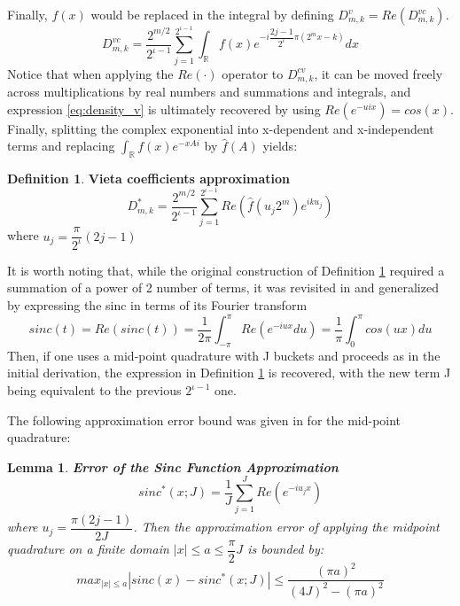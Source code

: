 \documentclass[12,twoside]{mammeTFM}
\newtheorem{lem}[thm]{Lemma}
\theoremstyle{definition}
\newtheorem{definition}[thm]{Definition}
\theoremstyle{remark}
\newcommand{\R}{\ensuremath{\mathbb{R}}}
\begin{document}
\begin{itemize}
{Finally, $f(x)$ would be replaced in the integral by defining $D_{m,k}^{v} = Re \left( D_{m,k}^{vc} \right)$. 
\begin{equation}
D_{m,k}^{vc} =  \dfrac{2^{m / 2}}{2^{\iota-1}} \sum_{j=1}^{2^{\iota-1}} \int_{\mathbb{R}} f(x) e^{-i\dfrac{2 j-1}{2^{\iota}} \pi\left(2^{m} x-k\right) } d x
\end{equation}
Notice that when applying the $Re(\cdot)$ operator to $D_{m,k}^{cv}$, it can be moved freely across multiplications by real numbers and summations and integrals, and expression \ref{eq:density_v} is ultimately recovered by using $Re \left(e^{-uix}\right) = cos(x)$. Finally, splitting the complex exponential into x-dependent and x-independent terms and replacing $\int_{\R} f(x) e^{-xAi}$ by $\hat{f}(A)$ yields:
\begin{definition} \textbf{Vieta coefficients approximation}\label{def:vieta}
\begin{equation}
D_{m,k}^{*} =  \dfrac{2^{m / 2}}{2^{\iota-1}} \sum_{j=1}^{2^{\iota-1}} Re \left( \hat{f} \left(u_j 2^{m} \right) e^{ik u_j} \right)
\end{equation}
where $u_j = \dfrac{\pi}{2^{\iota}}(2j - 1)$
\end{definition}
}
\end{itemize} 

It is worth noting that, while the original construction of Definition \ref{def:vieta} required a summation of a power of 2 number of terms, it was revisited in \cite{mar17} and generalized by expressing the sinc in terms of its Fourier transform 
\begin{equation}
sinc(t) = Re\left(sinc(t)\right) = \dfrac{1}{2\pi} \int_{-\pi}^{\pi} Re \left( e^{-iux} du \right) = \dfrac{1}{\pi} \int_{0}^{\pi} cos(ux) du
\end{equation}
Then, if one uses a mid-point quadrature with J buckets and proceeds as in the initial derivation, the expression  in Definition \ref{def:vieta} is recovered, with the new term J being equivalent to the previous $2^{\iota -1}$ one.

The following approximation error bound was given in \cite{mar17} for the mid-point quadrature:
\begin{lem} \textbf{Error of the Sinc Function Approximation}
\begin{equation} \label{lem:error_sinc}
sinc^{*}(x; J) = \dfrac{1}{J}\sum_{j = 1}^J Re\left( e^{-iu_jx} \right)
\end{equation}
where $u_j = \dfrac{\pi (2j - 1)}{2J}$. Then the approximation error of applying the midpoint quadrature on a finite domain $|x| \leq a \leq \dfrac{\pi}{2}J$ is bounded by:
\begin{equation}
max_{|x| \leq a} \left|sinc(x) - sinc^{*}(x; J) \right| \leq \dfrac{(\pi a)^2}{(4J)^2 - (\pi a)^2}
\end{equation}
\end{lem}
\end{document}
